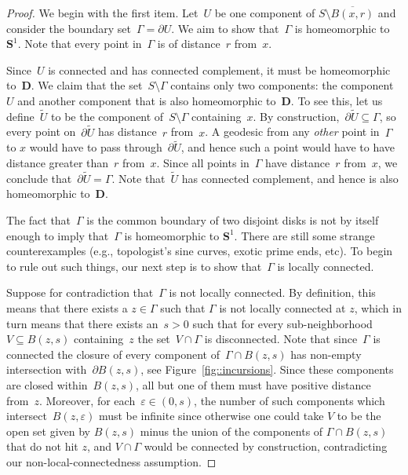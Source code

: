 \documentclass[JEP,XML,SOM,Unicode]{cedram}
\let\epsilon\varepsilon
\theoremstyle{plain}
\numberwithin{theorem}{section}
\theoremstyle{definition}
\newcommand{\D}{\mathbf{D}}
\renewcommand{\S}{{\mathbf S}}
\let\ol\overline
\let\wt\widetilde
\begin{document}
\begin{proof}
We begin with the first item. Let~$U$ be one component of $S \setminus \ol{B(x,r)}$ and consider the boundary set~$\Gamma = \partial U$. We aim to show that~$\Gamma$ is homeomorphic to $\S^1$. Note that every point in~$\Gamma$ is of distance~$r$ from~$x$.

Since~$U$ is connected and has connected complement, it must be homeomorphic to~$\D$. We claim that the set~$S \setminus \Gamma$ contains only two components: the component~$U$ and another component that is also homeomorphic to~$\D$. To see this, let us define~$\wt U$ to be the component of~$S \setminus \Gamma$ containing~$x$. By construction,~$\partial \wt U \subseteq \Gamma$, so every point on~$\partial \wt{U}$ has distance~$r$ from~$x$. A geodesic from any \emph{other} point in~$\Gamma$ to $x$ would have to pass through~$\partial \wt U$, and hence such a point would have to have distance greater than~$r$ from~$x$. Since all points in~$\Gamma$ have distance~$r$ from~$x$, we conclude that~$\partial \wt{U} = \Gamma$. Note that~$\wt U$ has connected complement, and hence is also homeomorphic to~$\D$.

The fact that~$\Gamma$ is the common boundary of two disjoint disks is not by itself enough to imply that~$\Gamma$ is homeomorphic to $\S^1$. There are still some strange counterexamples (e.g., topologist's sine curves, exotic prime ends, etc). To begin to rule out such things, our next step is to show that~$\Gamma$ is locally connected.

Suppose for contradiction that~$\Gamma$ is not locally connected. By definition, this means that there exists a $z \in \Gamma$ such that $\Gamma$ is not locally connected at $z$, which in turn means that there exists an~$s > 0$ such that for every sub-neighborhood~$V \subseteq B(z,s)$ containing~$z$ the set~$V \cap \Gamma$ is disconnected. Note that since~$\Gamma$ is connected the closure of every component of~$\Gamma \cap B(z,s)$ has non-empty intersection with~$\partial B(z,s)$, see Figure~\ref{fig::incursions}. Since these components are closed within~$B(z,s)$, all but one of them must have positive distance from~$z$. Moreover, for each~$\epsilon \in (0,s)$, the number of such components which intersect~$B(z,\epsilon)$ must be infinite since otherwise one could take $V$ to be the open set given by $B(z,s)$ minus the union of the components of $\Gamma \cap B(z,s)$ that do not hit $z$, and $V \cap \Gamma$ would be connected by construction, contradicting our non-local-connectedness assumption.


\end{proof}
\end{document}

